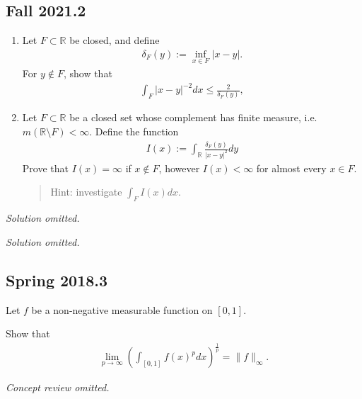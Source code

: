 \hypertarget{fall-2021.2}{%
\subsection{Fall 2021.2}\label{fall-2021.2}}

\begin{problem}[?]

\begin{enumerate}
\def\labelenumi{\alph{enumi}.}
\item
  Let \(F \subset \mathbb{R}\) be closed, and define
  \begin{align*}
  \delta_{F}(y):=\inf _{x \in F}|x-y| .
  \end{align*}
  For \(y \notin F\), show that
  \begin{align*}
  \int_{F}|x-y|^{-2} d x \leq \frac{2}{\delta_F(y)},
  \end{align*}
\item
  Let \(F \subset \mathbb{R}\) be a closed set whose complement has
  finite measure, i.e.~\(m({\mathbb{R}}\setminus F)< \infty\). Define
  the function
  \begin{align*}
  I(x):=\int_{\mathbb{R}} \frac{\delta_{F}(y)}{|x-y|^{2}} d y
  \end{align*}
  Prove that \(I(x)=\infty\) if \(x \not\in F\), however \(I(x)<\infty\)
  for almost every \(x \in F\).

  \begin{quote}
  Hint: investigate \(\int_{F} I(x) d x\).
  \end{quote}
\end{enumerate}

\end{problem}

\emph{Solution omitted.}

\emph{Solution omitted.}

\hypertarget{spring-2018.3}{%
\subsection{Spring 2018.3}\label{spring-2018.3}}

Let \(f\) be a non-negative measurable function on \([0, 1]\).

Show that
\begin{align*}
\lim _{p \rightarrow \infty}\left(\int_{[0,1]} f(x)^{p} d x\right)^{\frac{1}{p}}=\|f\|_{\infty}.
\end{align*}

\emph{Concept review omitted.}

